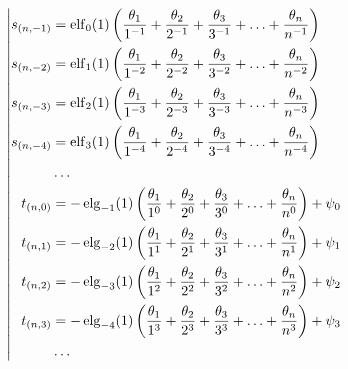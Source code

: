 %
\begin{equation*} \left| \begin{aligned}
s_{(n,-1)} &=
  \elf_0(1) \left(
  \frac{\theta_1}{1^{-1}}
+ \frac{\theta_2}{2^{-1}}
+ \frac{\theta_3}{3^{-1}}
+ \ldots
+ \frac{\theta_n}{n^{-1}} \right) \\
%
s_{(n,-2)} &=
  \elf_1(1) \left(
  \frac{\theta_1}{1^{-2}}
+ \frac{\theta_2}{2^{-2}}
+ \frac{\theta_3}{3^{-2}}
+ \ldots
+ \frac{\theta_n}{n^{-2}} \right) \\
%
s_{(n,-3)} &=
  \elf_2(1) \left(
  \frac{\theta_1}{1^{-3}}
+ \frac{\theta_2}{2^{-3}}
+ \frac{\theta_3}{3^{-3}}
+ \ldots
+ \frac{\theta_n}{n^{-3}} \right) \\
%
s_{(n,-4)} &=
  \elf_3(1) \left(
  \frac{\theta_1}{1^{-4}}
+ \frac{\theta_2}{2^{-4}}
+ \frac{\theta_3}{3^{-4}}
+ \ldots
+ \frac{\theta_n}{n^{-4}} \right) \\
%
&\ldots \\
%
t_{(n,0)} &=
- \elg_{-1}(1) \left(
  \frac{\theta_1}{1^0}
+ \frac{\theta_2}{2^0}
+ \frac{\theta_3}{3^0}
+ \ldots
+ \frac{\theta_n}{n^0} \right)
+ \psi_0 \\
%
t_{(n,1)} &=
- \elg_{-2}(1) \left(
  \frac{\theta_1}{1^1}
+ \frac{\theta_2}{2^1}
+ \frac{\theta_3}{3^1}
+ \ldots
+ \frac{\theta_n}{n^1} \right)
+ \psi_1 \\
%
t_{(n,2)} &=
- \elg_{-3}(1) \left(
  \frac{\theta_1}{1^2}
+ \frac{\theta_2}{2^2}
+ \frac{\theta_3}{3^2}
+ \ldots
+ \frac{\theta_n}{n^2} \right)
+ \psi_2 \\
%
t_{(n,3)} &=
- \elg_{-4}(1) \left(
  \frac{\theta_1}{1^3}
+ \frac{\theta_2}{2^3}
+ \frac{\theta_3}{3^3}
+ \ldots
+ \frac{\theta_n}{n^3} \right)
+ \psi_3 \\
%
&\ldots \\
\end{aligned} \right. \end{equation*}